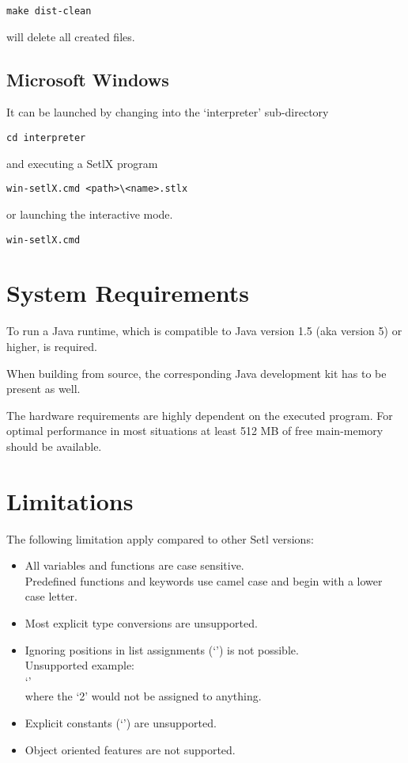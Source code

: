 \begin{lstlisting}
make dist-clean
\end{lstlisting}

will delete all created files.

\subsection{Microsoft Windows}

It can be launched by changing into the `interpreter' sub-directory

\begin{lstlisting}
cd interpreter
\end{lstlisting}

and executing a SetlX program

\begin{lstlisting}
win-setlX.cmd <path>\<name>.stlx
\end{lstlisting}

or launching the interactive mode.

\begin{lstlisting}
win-setlX.cmd
\end{lstlisting}

\section{System Requirements}

To run \setlX{} a Java runtime, which is compatible to Java version 1.5 (aka version 5) or higher, is required.

When building from source, the corresponding Java development kit has to be present as well.

The hardware requirements are highly dependent on the executed \SetlX{} program. For optimal performance in most situations at least 512 MB of free main-memory should be available.

\section{Limitations}
The following limitation apply compared to other Setl versions:

\begin{itemize}
	\item All variables and functions are case sensitive.\\
        Predefined functions and keywords use camel case and begin with a lower case letter.
    \item Most explicit type conversions are unsupported.
    \item Ignoring positions in list assignments (`\command{-}') is not possible.\\
        Unsupported example:\\
        `\command{[x,-,y] := [1,2,3];}'\\
        where the `2' would not be assigned to anything.
    \item Explicit constants (`') are unsupported.
    \item Object oriented features are not supported.
\end{itemize}

